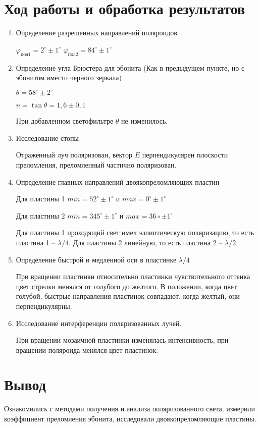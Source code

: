 \documentclass{letask}
\begin{document}
\section{Ход работы и обработка результатов}

\begin{enumerate}
\item Определение разрешенных направлений поляроидов 

$\varphi_{\text{пол}1} = 2^\circ \pm 1^\circ$
\hspace{5cm}
$\varphi_{\text{пол}2} = 84^\circ \pm 1^\circ$


\item Определение угла Брюстера для эбонита (Как в предыдущем пункте, но с эбонитом вместо черного зеркала)

$\theta = 58^\circ \pm 2^\circ$

$ n = \tan{\theta} = 1,6 \pm 0,1 $

При добавленном светофильтре $\theta$ не изменилось.

\item Исследование стопы

Отраженный луч поляризован, вектор $E$ перпендикулярен плоскости преломления, преломленный частично поляризован.

\item Определение главных направлений двоякопреломляющих пластин 

Для пластины 1 $min = 52^\circ \pm 1^\circ$ и $max = 0^\circ \pm 1^\circ$

Для пластины 2 $min = 345^\circ \pm 1^\circ$ и $max = 36\circ \pm 1^\circ$

Для пластины 1 проходящий свет имел эллиптическую поляризацию, то есть пластина 1 -- $\lambda/4$. Для пластины 2 линейную, то есть пластина 2 --  $\lambda/2$.

\item Определение быстрой и медленной оси в пластинке $\lambda/4$


При вращении пластинки относительно пластинки чувствительного оттенка цвет стрелки менялся от голубого до желтого. В положении, когда цвет голубой, быстрые направления пластинок совпадают, когда желтый, они перпендикулярны.

\item Исследование интерференции поляризованных лучей.

При вращении мозаичной пластинки изменялась интенсивность, при вращении поляроида менялся цвет пластинок.

\end{enumerate}

\section{Вывод}
Ознакомились с методами получения и анализа поляризованного света, измерили коэффициент преломления эбонита, исследовали двоякопреломляющие пластины.
\end{document}
